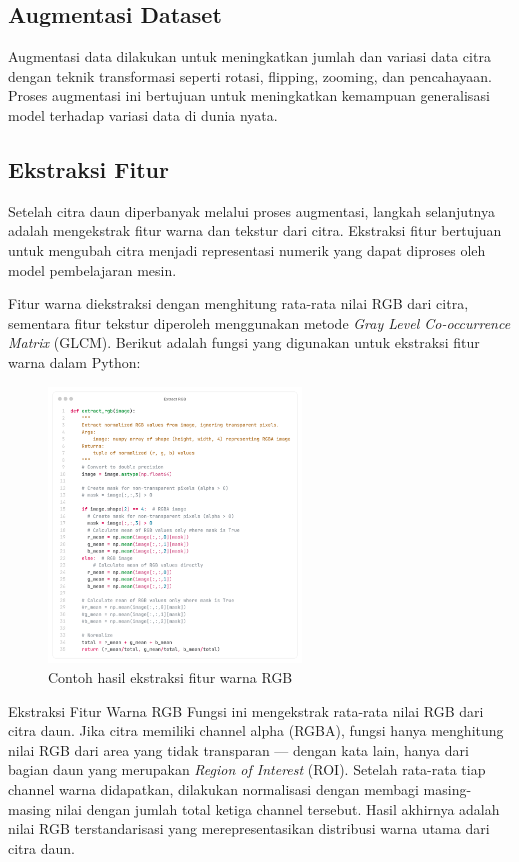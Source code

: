 \subsection{Augmentasi Dataset} \label{IV.Augmentasi Dataset}
Augmentasi data dilakukan untuk meningkatkan jumlah dan variasi data citra dengan teknik transformasi seperti rotasi, flipping, zooming, dan pencahayaan. Proses augmentasi ini bertujuan untuk meningkatkan kemampuan generalisasi model terhadap variasi data di dunia nyata.


\subsection{Ekstraksi Fitur} \label{IV.Ekstraksi Fitur}
Setelah citra daun diperbanyak melalui proses augmentasi, langkah selanjutnya adalah mengekstrak fitur warna dan tekstur dari citra. Ekstraksi fitur bertujuan untuk mengubah citra menjadi representasi numerik yang dapat diproses oleh model pembelajaran mesin.

Fitur warna diekstraksi dengan menghitung rata-rata nilai RGB dari citra, sementara fitur tekstur diperoleh menggunakan metode \textit{Gray Level Co-occurrence Matrix} (GLCM). Berikut adalah fungsi yang digunakan untuk ekstraksi fitur warna dalam Python:

\begin{figure}[H]
  \centering
  \includegraphics[width=0.6\textwidth]{figure/chapter-4-extract_rgb.png}
  \caption{Contoh hasil ekstraksi fitur warna RGB}
  \label{fig:extract_rgb}
\end{figure}

{Ekstraksi Fitur Warna RGB}
Fungsi ini mengekstrak rata-rata nilai RGB dari citra daun. Jika citra memiliki channel alpha (RGBA), fungsi hanya menghitung nilai RGB dari area yang tidak transparan — dengan kata lain, hanya dari bagian daun yang merupakan \textit{Region of Interest} (ROI). Setelah rata-rata tiap channel warna didapatkan, dilakukan normalisasi dengan membagi masing-masing nilai dengan jumlah total ketiga channel tersebut. Hasil akhirnya adalah nilai RGB terstandarisasi yang merepresentasikan distribusi warna utama dari citra daun.

